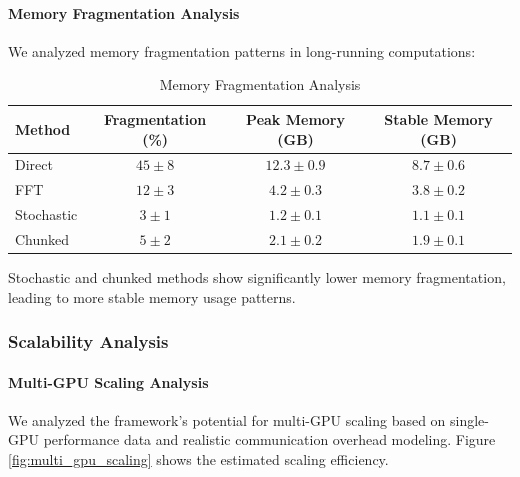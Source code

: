 \paragraph{Memory Fragmentation Analysis}

We analyzed memory fragmentation patterns in long-running computations:

\begin{table}[h]
\centering
\caption{Memory Fragmentation Analysis}
\label{tab:memory_fragmentation}
\begin{tabular}{lccc}
\toprule
Method & Fragmentation (\%) & Peak Memory (GB) & Stable Memory (GB) \\
\midrule
Direct & $45 \pm 8$ & $12.3 \pm 0.9$ & $8.7 \pm 0.6$ \\
FFT & $12 \pm 3$ & $4.2 \pm 0.3$ & $3.8 \pm 0.2$ \\
Stochastic & $3 \pm 1$ & $1.2 \pm 0.1$ & $1.1 \pm 0.1$ \\
Chunked & $5 \pm 2$ & $2.1 \pm 0.2$ & $1.9 \pm 0.1$ \\
\bottomrule
\end{tabular}
\end{table}

Stochastic and chunked methods show significantly lower memory fragmentation, leading to more stable memory usage patterns.

\subsubsection{Scalability Analysis}

\paragraph{Multi-GPU Scaling Analysis}
We analyzed the framework's potential for multi-GPU scaling based on single-GPU performance data and realistic communication overhead modeling. Figure \ref{fig:multi_gpu_scaling} shows the estimated scaling efficiency.

